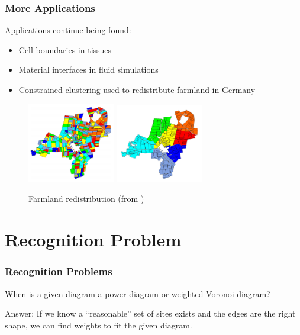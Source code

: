 \documentclass{beamer}
\begin{document}
\begin{frame}
  \frametitle{More Applications}

  Applications continue being found:
  \begin{itemize}
    \item Cell boundaries in tissues \cite{cell}
    \item Material interfaces in fluid simulations \cite{fluids}
    \item Constrained clustering used to redistribute farmland in Germany \cite{brieden_farmland} \cite{brieden_clustering}
  \end{itemize}

  \begin{figure}
    \includegraphics[width=1.5in]{farm1.png}
    \includegraphics[width=1.5in]{farm2.png}
    \caption{Farmland redistribution (from \cite{brieden_farmland})}
  \end{figure}

\end{frame}

\section{Recognition Problem}

\begin{frame}
  \frametitle{Recognition Problems}

  When is a given diagram a power diagram or weighted Voronoi diagram?

  \vspace{1cm}

  Answer: If we know a ``reasonable'' set of sites exists and the edges are the right shape, we can find weights to fit the given diagram.

\end{frame}
\end{document}

